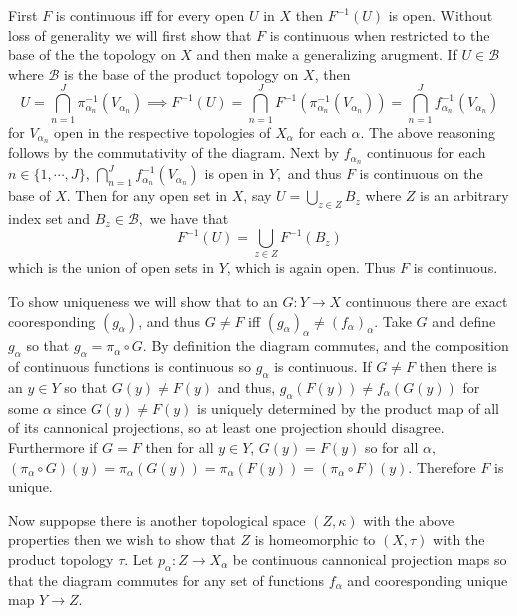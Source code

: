 \documentclass[11pt]{amsart}
\theoremstyle{definition}
\numberwithin{theorem}{section}
\numberwithin{definition}{section}
\numberwithin{equation}{section}
\def\scriptb{{\mathcal B}}
\begin{document}
	First $F$ is continuous iff for every open $U$ in $X$ then $F^{-1}(U)$ is open. Without loss of generality we will first show that $F$ is continuous when restricted to the base of the the topology on $X$ and then make a generalizing arugment. If $U \in \scriptb$ where $\scriptb$ is the base of the product topology on $X$, then $$U = \bigcap_{n=1}^J \pi^{-1}_{\alpha_n}(V_{\alpha_n}) \implies F^{-1}(U) = \bigcap_{n=1}^J F^{-1}( \pi^{-1}_{\alpha_n}(V_{\alpha_n})) = \bigcap_{n=1}^J f_{\alpha_n}^{-1}(V_{\alpha_n})$$
	for $V_{\alpha_n}$ open in the respective topologies of $X_\alpha$ for each $\alpha$. The above reasoning follows by the commutativity of the diagram. Next by $f_{\alpha_n}$ continuous for each $n \in \{1, \cdots, J\}$, $\bigcap_{n=1}^J f_{\alpha_n}^{-1}(V_{\alpha_n})$ is open in $Y,$ and thus $F$ is continuous on the base of $X$. Then for any open set in $X$, say $U = \bigcup_{z\in Z} B_z$ where $Z$ is an arbitrary index set and $B_z \in \scriptb,$ we have that 
	\begin{equation*}
		F^{-1}(U) = \bigcup_{z \in Z} F^{-1}(B_z)
	\end{equation*}
	which is the union of open sets in $Y$, which is again open. Thus $F$ is continuous.

	To show uniqueness we will show that to an $G: Y \to X$  continuous there are exact cooresponding $(g_\alpha)$, 
	and thus $G \neq F$ iff $(g_\alpha)_{\alpha} \neq (f_\alpha)_\alpha$. Take $G$ and define $g_\alpha$ so that $g_\alpha = \pi_\alpha \circ G$. By definition the diagram commutes, and the composition of continuous functions is continuous so $g_\alpha$ is continuous. If $G \neq F$ then there is an $y \in Y$ so that $G(y) \neq F(y)$ and thus, $g_\alpha(F(y)) \neq f_\alpha(G(y))$ for some $\alpha$ since $G(y) \neq F(y)$ is uniquely determined by the product map of all of its cannonical projections, so at least one projection should disagree. Furthermore if $G = F$ then for all $y \in Y$, $G(y) = F(y)$ so for all $\alpha,$ $(\pi_{\alpha} \circ G)(y) = \pi_\alpha(G(y)) = \pi_\alpha(F(y)) = (\pi_\alpha \circ F)(y)$. Therefore $F$ is unique.

	Now suppopse there is another topological space $(Z, \kappa)$ with the above properties then we wish to show that $Z$ is homeomorphic to $(X, \tau)$ with the product topology $\tau.$ Let $p_\alpha: Z \to X_\alpha$ be continuous cannonical projection maps so that the diagram commutes for any set of functions $f_\alpha$ and cooresponding unique map $Y \to Z$.
\end{document}
